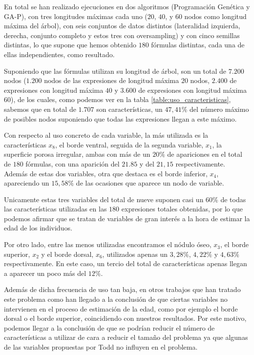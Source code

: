 En total se han realizado ejecuciones en dos algoritmos (Programación Genética y GA-P), con tres longitudes máximas cada uno ($20$, $40$, y $60$ nodos como longitud máxima del árbol), con seis conjuntos de datos distintos (lateralidad izquierda, derecha, conjunto completo y estos tres con oversampling) y con cinco semillas distintas, lo que supone que hemos obtenido $180$ fórmulas distintas, cada una de ellas independientes, como resultado.

Suponiendo que las fórmulas utilizan su longitud de árbol, son un total de $7.200$ nodos ($1.200$ nodos de las expresiones de longitud máxima $20$ nodos, $2.400$ de expresiones con longitud máxima $40$ y $3.600$ de expresiones con longitud máxima $60$), de los cuales, como podemos ver en la tabla \ref{table:uso_caracteristicas}, sabemos que en total de $1.707$ son características, un $47,41\%$ del número máximo de posibles nodos suponiendo que todas las expresiones llegan a este máximo.

Con respecto al uso concreto de cada variable, la más utilizada es la características $x_8$, el borde ventral, seguida de la segunda variable, $x_1$, la superficie porosa irregular, ambas con más de un $20\%$ de apariciones en el total de $180$ fórmulas, con una aparición del $21.85$ y del $21,15$ respectivamente. Además de estas dos variables, otra que destaca es el borde inferior, $x_4$, apareciendo un $15,58\%$ de las ocasiones que aparece un nodo de variable.

Unicamente estas tres variables del total de nueve suponen casi un $60\%$ de todas las características utilizadas en las $180$ expresiones totales obtenidas, por lo que podemos afirmar que se tratan de variables de gran interés a la hora de estimar la edad de los individuos.

Por otro lado, entre las menos utilizadas encontramos el nódulo óseo, $x_3$, el borde superior, $x_2$ y el borde dorsal, $x_6$, utilizados apenas un $3,28\%$, $4,22\%$ y $4,63\%$ respectivamente. En este caso, un tercio del total de características apenas llegan a aparecer un poco más del $12\%$.

Además de dicha frecuencia de uso tan baja, en otros trabajos que han tratado este problema como \cite{NSLVOrd} han llegado a la conclusión de que ciertas variables no intervienen en el proceso de estimación de la edad, como por ejemplo el borde dorsal o el borde superior, coincidiendo con nuestros resultados. Por este motivo, podemos llegar a la conclusión de que se podrían reducir el número de características a utilizar de cara a reducir el tamaño del problema ya que algunas de las variables propuestas por Todd no influyen en el problema.


\newpage

